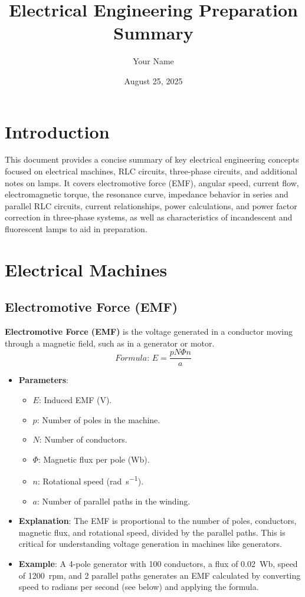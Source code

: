 \documentclass[12pt]{article}
\newcommand{\concept}[1]{\textbf{#1}}
\newcommand{\formula}[1]{\textit{Formula: }#1}
\begin{document}
\title{Electrical Engineering Preparation Summary}
\author{Your Name}
\date{August 25, 2025}
\maketitle
\tableofcontents
\newpage
\section{Introduction}
This document provides a concise summary of key electrical engineering concepts focused on electrical machines, RLC circuits, three-phase circuits, and additional notes on lamps. It covers electromotive force (EMF), angular speed, current flow, electromagnetic torque, the resonance curve, impedance behavior in series and parallel RLC circuits, current relationships, power calculations, and power factor correction in three-phase systems, as well as characteristics of incandescent and fluorescent lamps to aid in preparation.
\section{Electrical Machines}
\subsection{Electromotive Force (EMF)}
\concept{Electromotive Force (EMF)} is the voltage generated in a conductor moving through a magnetic field, such as in a generator or motor.
\[
\formula{E = \frac{p N \Phi n}{a}}
\]
\begin{itemize}
    \item \textbf{Parameters}:
        \begin{itemize}
            \item \(E\): Induced EMF (\si{\volt}).
            \item \(p\): Number of poles in the machine.
            \item \(N\): Number of conductors.
            \item \(\Phi\): Magnetic flux per pole (\si{\weber}).
            \item \(n\): Rotational speed (\si{\radian\per\second}).
            \item \(a\): Number of parallel paths in the winding.
        \end{itemize}
    \item \textbf{Explanation}: The EMF is proportional to the number of poles, conductors, magnetic flux, and rotational speed, divided by the parallel paths. This is critical for understanding voltage generation in machines like generators.
    \item \textbf{Example}: A 4-pole generator with 100 conductors, a flux of \SI{0.02}{\weber}, speed of \SI{1200}{rpm}, and 2 parallel paths generates an EMF calculated by converting speed to radians per second (see below) and applying the formula.
\end{itemize}
\end{document}
